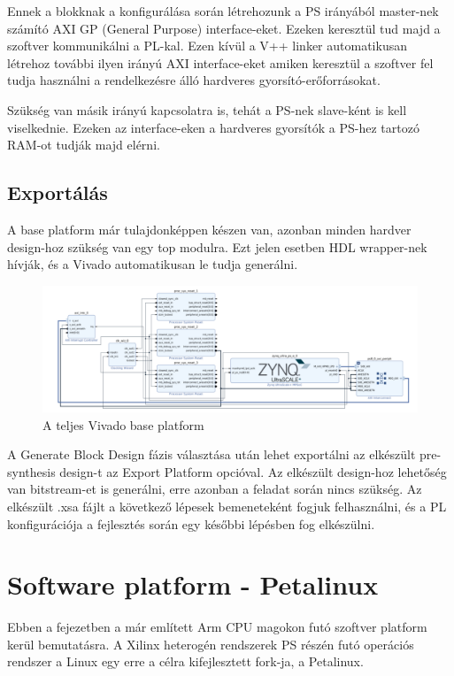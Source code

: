 Ennek a blokknak a konfigurálása során létrehozunk a PS irányából master-nek számító AXI GP (General Purpose) interface-eket. Ezeken keresztül tud majd a szoftver kommunikálni a PL-kal. Ezen kívül a V++ linker automatikusan létrehoz további ilyen irányú AXI interface-eket amiken keresztül a szoftver fel tudja használni a rendelkezésre álló hardveres gyorsító-erőforrásokat.

Szükség van másik irányú kapcsolatra is, tehát a PS-nek slave-ként is kell viselkednie. Ezeken az interface-eken a hardveres gyorsítók a PS-hez tartozó RAM-ot tudják majd elérni.

\subsection{Exportálás}
A base platform már tulajdonképpen készen van, azonban minden hardver design-hoz szükség van egy top modulra. Ezt jelen esetben HDL wrapper-nek hívják, és a Vivado automatikusan le tudja generálni.\\

\begin{figure}[!ht]
    \centering
    \includegraphics[width=150mm, keepaspectratio]{figures/base_platform.png}
    \caption{A teljes Vivado base platform}
\end{figure}

A Generate Block Design fázis választása után lehet exportálni az elkészült pre-synthesis design-t az Export Platform opcióval. Az elkészült design-hoz lehetőség van bitstream-et is generálni, erre azonban a feladat során nincs szükség. Az elkészült .xsa fájlt a következő lépesek bemeneteként fogjuk felhasználni, és a PL konfigurációja a fejlesztés során egy későbbi lépésben fog elkészülni.

\section{Software platform - Petalinux}
Ebben a fejezetben a már említett Arm CPU magokon futó szoftver platform kerül bemutatásra. A Xilinx heterogén rendszerek PS részén futó operációs rendszer a Linux egy erre a célra kifejlesztett fork-ja, a Petalinux.

